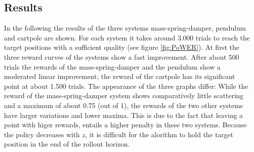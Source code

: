 \documentclass[letterpaper, 10 pt, conference]{ieeeconf}  %
\begin{document}

%

\subsection{Results}
In the following the results of the three systems mass-spring-damper, pendulum and cartpole are shown. For each system it takes around 3.000 trials to reach the target positions with a sufficient quality (see figure \ref{fig:PoWER}). At first the three reward curves of the systems show a fast improvement. After about 500 trials the rewards of the mass-spring-damper and the pendulum show a moderated linear improvement; the reward of the cartpole has its significant point at about 1.500 trials. The appearance of the three graphs differ: While the reward of the mass-spring-damper system shows comparatively little scattering and a maximum of about 0.75 (out of 1), the rewards of the two other systems have larger variations and lower maxima. This is due to the fact that leaving a point with higer rewards, entails a higher penalty in these two systems. Because the policy decreases with $z$, it is difficult for the alorithm to hold the target position in the end of the rollout horizon.
\end{document}
